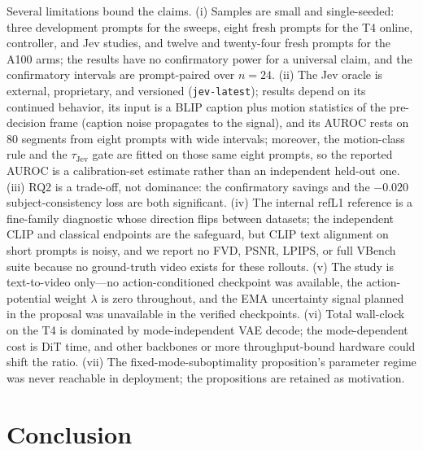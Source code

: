 \documentclass[journal]{IEEEtran}
\begin{document}
Several limitations bound the claims. (i) Samples are small and single-seeded: three development prompts for the sweeps, eight fresh prompts for the T4 online, controller, and Jev studies, and twelve and twenty-four fresh prompts for the A100 arms; the results have no confirmatory power for a universal claim, and the confirmatory intervals are prompt-paired over $n{=}24$. (ii) The Jev oracle is external, proprietary, and versioned (\texttt{jev-latest}); results depend on its continued behavior, its input is a BLIP caption plus motion statistics of the pre-decision frame (caption noise propagates to the signal), and its AUROC rests on 80 segments from eight prompts with wide intervals; moreover, the motion-class rule and the $\tau_{\text{Jev}}$ gate are fitted on those same eight prompts, so the reported AUROC is a calibration-set estimate rather than an independent held-out one. (iii) RQ2 is a trade-off, not dominance: the confirmatory savings and the $-0.020$ subject-consistency loss are both significant. (iv) The internal refL1 reference is a fine-family diagnostic whose direction flips between datasets; the independent CLIP and classical endpoints are the safeguard, but CLIP text alignment on short prompts is noisy, and we report no FVD, PSNR, LPIPS, or full VBench suite because no ground-truth video exists for these rollouts. (v) The study is text-to-video only---no action-conditioned checkpoint was available, the action-potential weight $\lambda$ is zero throughout, and the EMA uncertainty signal planned in the proposal was unavailable in the verified checkpoints. (vi) Total wall-clock on the T4 is dominated by mode-independent VAE decode; the mode-dependent cost is DiT time, and other backbones or more throughput-bound hardware could shift the ratio. (vii) The fixed-mode-suboptimality proposition's parameter regime was never reachable in deployment; the propositions are retained as motivation.

\section{Conclusion}
\label{sec:conclusion}
\end{document}
